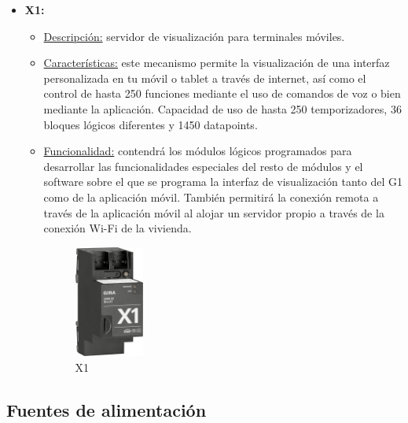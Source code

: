 \begin{itemize}
\item \textbf{X1:} 
	\begin{itemize}
	\item\underline{Descripción:} servidor de visualización para terminales móviles.
	\item \underline{Características:}  este mecanismo permite la visualización de una interfaz personalizada en tu móvil o tablet  a través de internet, así como el control de hasta 250 funciones mediante el uso de comandos de voz o bien mediante la aplicación. Capacidad de uso de hasta 250 temporizadores, 36 bloques lógicos diferentes y 1450 datapoints.
	\item \underline{Funcionalidad:} contendrá los módulos lógicos programados para desarrollar las funcionalidades especiales del resto de módulos y el software sobre el que se programa la interfaz de visualización tanto del G1 como de la aplicación móvil. También permitirá la conexión remota a través de la aplicación móvil al alojar un servidor propio a través de la conexión Wi-Fi de la vivienda.
	\begin{figure}[h]
	\centering
	\includegraphics[width=0.23\textwidth]{figures/x1.png}   
	\caption{X1}
	\label{fig:x1}
	\end{figure}
	\end{itemize} 
\end{itemize} 

\subsection{Fuentes de alimentación}

